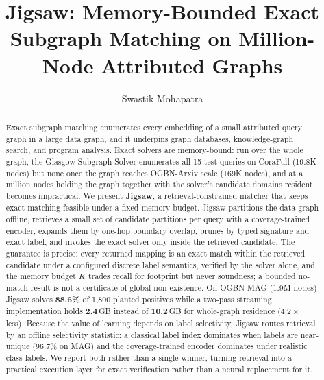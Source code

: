 \documentclass[sigconf, nonacm]{acmart}
\begin{document}
\title{Jigsaw: Memory-Bounded Exact Subgraph Matching on Million-Node Attributed Graphs}

\author{Swastik Mohapatra}

\begin{abstract}
Exact subgraph matching enumerates every embedding of a small attributed query graph in a large data graph, and it underpins graph databases, knowledge-graph search, and program analysis. Exact solvers are memory-bound: run over the whole graph, the Glasgow Subgraph Solver enumerates all 15 test queries on CoraFull (19.8K nodes) but none once the graph reaches OGBN-Arxiv scale (169K nodes), and at a million nodes holding the graph together with the solver's candidate domains resident becomes impractical. We present \textbf{Jigsaw}, a retrieval-constrained matcher that keeps exact matching feasible under a fixed memory budget. Jigsaw partitions the data graph offline, retrieves a small set of candidate partitions per query with a coverage-trained encoder, expands them by one-hop boundary overlap, prunes by typed signature and exact label, and invokes the exact solver only inside the retrieved candidate. The guarantee is precise: every returned mapping is an exact match within the retrieved candidate under a configured discrete label semantics, verified by the solver alone, and the memory budget $K$ trades recall for footprint but never soundness; a bounded no-match result is not a certificate of global non-existence. On OGBN-MAG (1.9M nodes) Jigsaw solves \textbf{88.6\%} of 1{,}800 planted positives while a two-pass streaming implementation holds \textbf{2.4}\,GB instead of \textbf{10.2}\,GB for whole-graph residence ($4.2\times$ less). Because the value of learning depends on label selectivity, Jigsaw routes retrieval by an offline selectivity statistic: a classical label index dominates when labels are near-unique (96.7\% on MAG) and the coverage-trained encoder dominates under realistic class labels. We report both rather than a single winner, turning retrieval into a practical execution layer for exact verification rather than a neural replacement for it.
\end{abstract}


\end{document}
